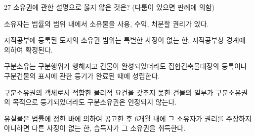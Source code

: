 \begin{question}{27}
소유권에 관한 설명으로 옳지 않은 것은? (다툼이 있으면 판례에 의함)
\begin{choices}
  \item 소유자는 법률의 범위 내에서 소유물을 사용, 수익, 처분할 권리가 있다.
  \item 지적공부에 등록된 토지의 소유권 범위는 특별한 사정이 없는 한, 지적공부상 경계에 의하여 확정된다.
  \item 구분소유는 구분행위가 행해지고 건물이 완성되었더라도 집합건축물대장의 등록이나 구분건물의 표시에 관한 등기가 완료된 때에 성립한다.
  \item 구분소유권의 객체로서 적합한 물리적 요건을 갖추지 못한 건물의 일부가 구분소유권의 목적으로 등기되었더라도 구분소유권은 인정되지 않는다.
  \item 유실물은 법률에 정한 바에 의하여 공고한 후 6개월 내에 그 소유자가 권리를 주장하지 아니하면 다른 사정이 없는 한, 습득자가 그 소유권을 취득한다.
\end{choices}
\end{question}
